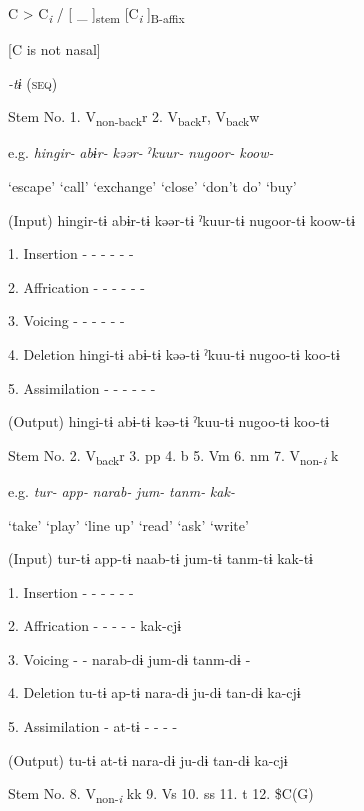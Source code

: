    C  >  C\textit{\textsubscript{i}}  /  [   \_ ]\textsubscript{stem}  [C\textit{\textsubscript{i}}  ]\textsubscript{B-affix}

    [C is not nasal]
\z

\begin{table}
\caption{\label{tab:key:61}. Verbal stems +} \textmd{\textit{{}-tɨ}}\textmd{ (\textsc{seq})}

Stem No.  1. V\textsubscript{non-back}r  2. V\textsubscript{back}r, V\textsubscript{back}w

  e.g.  \textit{hingir-}  \textit{abɨr-}  \textit{kəər-}  \textit{ˀkuur-}  \textit{nugoor-}  \textit{koow-}

    ‘escape’  ‘call’  ‘exchange’  ‘close’  ‘don’t do’  ‘buy’

  (Input)  hingir-tɨ  abɨr-tɨ  kəər-tɨ  ˀkuur-tɨ  nugoor-tɨ  koow-tɨ

1.  Insertion  {}-  {}-  {}-  {}-  {}-  {}-

2.  Affrication  {}-  {}-  {}-  {}-  {}-  {}-

3.  Voicing  {}-  {}-  {}-  {}-  {}-  {}-

4.  Deletion  hingi-tɨ  abɨ-tɨ  kəə-tɨ  ˀkuu-tɨ  nugoo-tɨ  koo-tɨ

5.  Assimilation  {}-  {}-  {}-  {}-  {}-  {}-

  (Output)  hingi-tɨ  abɨ-tɨ  kəə-tɨ  ˀkuu-tɨ  nugoo-tɨ  koo-tɨ

Stem No.  2. V\textsubscript{back}r  3. pp  4. b  5. Vm  6. nm  7. V\textsubscript{non-}\textit{\textsubscript{i} }k

  e.g.  \textit{tur-}  \textit{app-}  \textit{narab-}  \textit{jum-}  \textit{tanm-}  \textit{kak-}

    ‘take’  ‘play’  ‘line up’  ‘read’  ‘ask’  ‘write’

  (Input)  tur-tɨ  app-tɨ  naab-tɨ  jum-tɨ  tanm-tɨ  kak-tɨ

1.  Insertion  {}-  {}-  {}-  {}-  {}-  {}-

2.  Affrication  {}-  {}-  {}-  {}-  {}-  kak-cjɨ

3.  Voicing  {}-  {}-  narab-dɨ  jum-dɨ  tanm-dɨ  {}-

4.  Deletion  tu-tɨ  ap-tɨ  nara-dɨ  ju-dɨ  tan-dɨ  ka-cjɨ

5.  Assimilation  {}-  at-tɨ  {}-  {}-  {}-  {}-

  (Output)  tu-tɨ  at-tɨ  nara-dɨ  ju-dɨ  tan-dɨ  ka-cjɨ

  Stem No.  8. V\textsubscript{non-}\textit{\textsubscript{i} }kk  9. Vs  10. ss  11. t  12. \$C(G)


\end{table}
